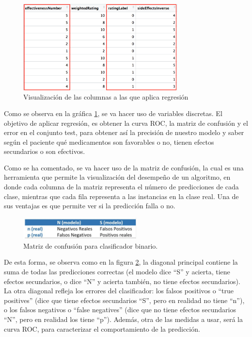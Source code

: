 \documentclass[spanish,]{article}
\begin{document}
\begin{figure}[h]
    \centering
    \includegraphics[width=0.75\textwidth]{imagenes/regresion/1.png}
    \caption{Visualización de las columnas a las que aplica regresión}
    \label{1}
\end{figure}

Como se observa en la gráfica \ref{1}, se va hacer uso de variables
discretas. El objetivo de aplicar regresión, es obtener la curva ROC, la
matriz de confusión y el error en el conjunto test, para obtener así la
precisión de nuestro modelo y saber según el paciente qué medicamentos
son favorables o no, tienen efectos secundarios o son efectivos.

Como se ha comentado, se va hacer uso de la matriz de confusión, la cual
es una herramienta que permite la visualización del desempeño de un
algoritmo, en donde cada columna de la matriz representa el número de
predicciones de cada clase, mientras que cada fila representa a las
instancias en la clase real. Una de sus ventajas es que permite ver si
la predicción falla o no.

\begin{figure}[h]
    \centering
    \includegraphics[width=0.55\textwidth]{imagenes/regresion/2.png}
    \caption{Matriz de confusión para clasificador binario.}
    \label{2}
\end{figure}

De esta forma, se observa como en la figura \ref{2}, la diagonal
principal contiene la suma de todas las predicciones correctas (el
modelo dice ``S'' y acierta, tiene efectos secundarios, o dice ``N'' y
acierta también, no tiene efectos secundarios). La otra diagonal refleja
los errores del clasificador: los falsos positivos o ``true positives''
(dice que tiene efectos secundarios ``S'', pero en realidad no tiene
``n''), o los falsos negativos o ``false negatives'' (dice que no tiene
efectos secundarios ``N'', pero en realidad los tiene ``p''). Además,
otra de las medidas a usar, será la curva ROC, para caracterizar el
comportamiento de la predicción.
\end{document}

